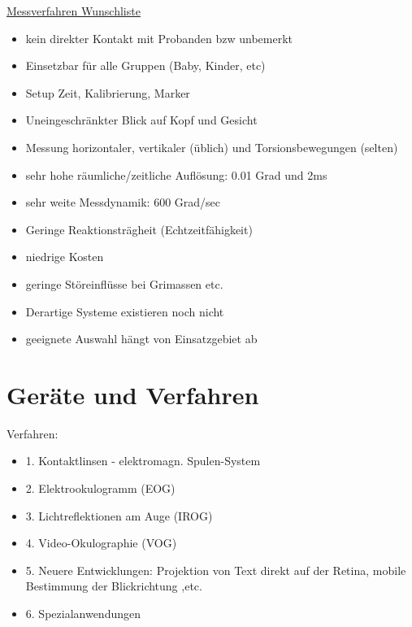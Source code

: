 \documentclass[a4paper,10pt,oneside]{article}
\begin{document}
\underline{Messverfahren Wunschliste} \\
	\begin{itemize}
		\item kein direkter Kontakt mit Probanden bzw unbemerkt 
		\item Einsetzbar für alle Gruppen (Baby, Kinder, etc)
		\item Setup Zeit, Kalibrierung, Marker
		\item Uneingeschränkter Blick auf Kopf und Gesicht
		\item Messung horizontaler, vertikaler (üblich) und Torsionsbewegungen (selten)
		\item sehr hohe räumliche/zeitliche Auflösung: 0.01 Grad und 2ms
		\item sehr weite Messdynamik: 600 Grad/sec
		\item Geringe Reaktionsträgheit (Echtzeitfähigkeit)
		\item niedrige Kosten
		\item geringe Störeinflüsse bei Grimassen etc.
		\item Derartige Systeme existieren noch nicht 
		\item geeignete Auswahl hängt von Einsatzgebiet ab
	\end{itemize}
	
\section{Geräte und Verfahren}
Verfahren:
	\begin{itemize}
		\item 1. Kontaktlinsen - elektromagn. Spulen-System
		\item 2. Elektrookulogramm (EOG)
		\item 3. Lichtreflektionen am Auge (IROG)
		\item 4. Video-Okulographie (VOG)
		\item 5. Neuere Entwicklungen: Projektion von Text direkt auf der Retina, mobile Bestimmung der Blickrichtung ,etc.
		\item 6. Spezialanwendungen
	\end{itemize}	 		
 		
\end{document}
